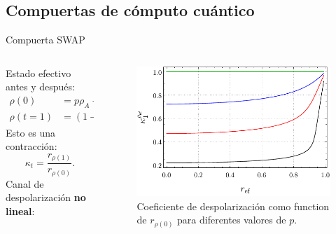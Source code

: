 \subsection{Compuertas de cómputo cuántico}
\begin{frame}{Compuerta SWAP}
    \begin{columns}
        \begin{column}{0.5\textwidth}
            Estado efectivo antes y después:
            \begin{align*}
                \rho(0)&=p\rho_{A}+(1-p)\rho_{B},\\
                \rho(t=1)&=(1-p)\rho_{A}+p\rho_{B}.
                \end{align*}\pause
                Esto es una contracción:
                \begin{equation*}
                    \kappa_{t}=\frac{r_{\rho(1)}}{r_{\rho(0)}}.
                  \end{equation*}\pause
                  Canal de despolarización \textbf{no lineal}:\pause
                  \begin{center}
                  \end{center}
        \end{column}\pause
        \begin{column}{0.5\textwidth}
            \begin{figure}[h!]
                \centering
                \includegraphics[width=0.9\linewidth]{figures/maxent_results/K(r).pdf}
                \caption{Coeficiente de despolarización como function de $r_{\rho(0)}$ para diferentes valores de $p$.}
              \end{figure}
        \end{column}
    \end{columns}
\end{frame}
